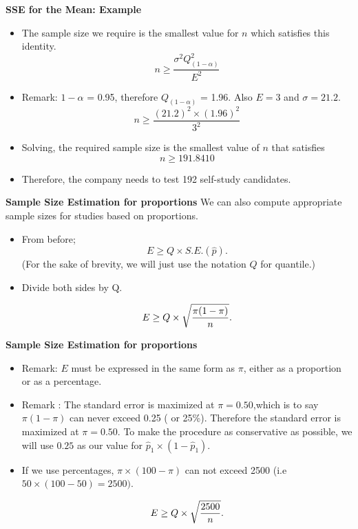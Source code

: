 \documentclass[]{report}
\begin{document}

\textbf{SSE for the Mean: Example}

\begin{itemize}
\item The sample size we require is the smallest value for $n$ which satisfies this identity.
\[ n \geq \frac{\sigma^2 Q^2_{(1-\alpha)}}{E^2}  \]
\item Remark: $1-\alpha$ = 0.95, therefore $Q_{(1-\alpha)}$ = 1.96. Also $E=3$ and $\sigma =21.2$.
\[ n \geq \frac{(21.2)^2 \times (1.96)^2}{3^2} \]
\item Solving, the required sample size is the smallest value of $n$ that satisfies
\[ n \geq 191.8410 \]
\item Therefore, the company needs to test 192 self-study candidates.
\end{itemize}



\textbf{Sample Size Estimation for proportions}
We can also compute appropriate sample sizes for studies based on proportions.
\begin{itemize}
\item From before; \[ E \geq Q \times S.E.(\hat{p}). \]
(For the sake of brevity, we will just use the notation $Q$ for quantile.)

\item Divide both sides by Q.

\[ E \geq Q \times \sqrt{ {\pi(1-\pi)  \over n} }. \]

\end{itemize}



\textbf{Sample Size Estimation for proportions}
\begin{itemize}
\item Remark: $E$ must be expressed in the same form as $\pi$, either as a proportion or as a percentage.
\item Remark : The standard error is maximized at $\pi = 0.50$,which is to say $\pi(1-\pi)$ can never exceed 0.25 ( or 25\%). Therefore the standard error is maximized at $\pi = 0.50$. To make the procedure as conservative as possible, we will use $0.25$ as our value for $\hat{p}_1 \times (1 - \hat{p}_1)$.
\item If we use percentages, $\pi \times (100-\pi)$ can not exceed 2500 (i.e $ 50 \times (100-50)=2500)$.

\[ E \geq Q \times \sqrt{{2500 \over n}}. \]


\end{itemize}
\end{document}
